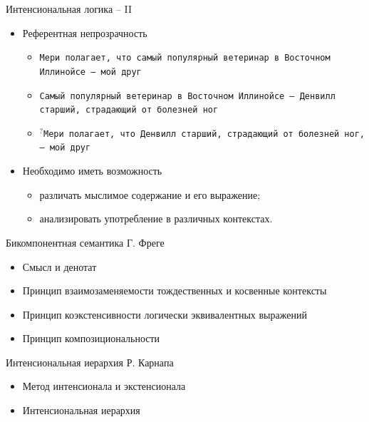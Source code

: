 \documentclass{beamer}
\begin{document}
\begin{frame}{Интенсиональная логика -- II}
\begin{itemize}
    \item Референтная непрозрачность
    	\medskip
	    \begin{itemize}
	        \item \texttt{Мери полагает, что самый популярный ветеринар в Восточном Иллинойсе — мой друг}
	        \smallskip
	        \item \texttt{Самый популярный ветеринар в Восточном Иллинойсе -- Денвилл старший, страдающий от болезней ног}
	        \smallskip
	        \item $^?$\texttt{Мери полагает, что Денвилл старший, страдающий от болезней ног,— мой друг}
	    \end{itemize}   	
    \medskip
	\item Необходимо иметь возможность
    	\medskip
	    \begin{itemize}
	        \item различать мыслимое содержание и его выражение;
	        \item анализировать употребление в различных контекстах.
	    \end{itemize}   	
\end{itemize}
\end{frame}

\begin{frame}{Бикомпонентная семантика Г. Фреге}
\begin{itemize}
    \item Смысл и денотат
	\medskip
	\item Принцип взаимозаменяемости тождественных и косвенные контексты
	\medskip
	\item Принцип коэкстенсивности логически эквивалентных выражений
	\medskip
	\item Принцип композициональности
\end{itemize}
\end{frame}

\begin{frame}{Интенсиональная иерархия Р. Карнапа}
\begin{itemize}
    \item Метод интенсионала и экстенсионала
	\medskip
	\item Интенсиональная иерархия
\end{itemize}
\end{frame}
\end{document}
